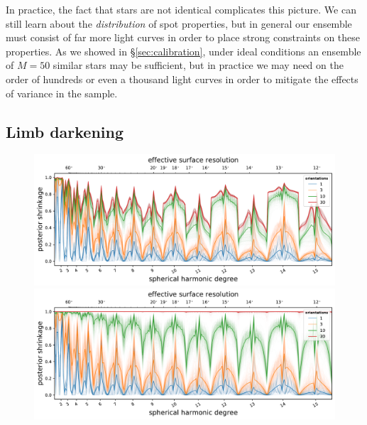 \documentclass[modern]{aastex62}
\begin{document}
In practice, the fact that stars are not identical complicates this picture.
We can still learn about the \emph{distribution} of spot properties, but
in general our ensemble must consist of far more light curves in order to
place strong constraints on these properties. As we showed in \S\ref{sec:calibration},
under ideal conditions an ensemble of $M = 50$ similar stars may be sufficient,
but in practice we may need on the order of hundreds or even a thousand light curves
in order to mitigate the effects of variance in the sample.

\subsection{Limb darkening}
\label{sec:limbdark}

\begin{figure}[t!]
    \begin{centering}
        \includegraphics[width=\linewidth]{figures/nullspace_ensemble_ld.pdf}
        \\
        \includegraphics[width=\linewidth]{figures/nullspace_ensemble_ld_var.pdf}
    \end{centering}
\end{figure}
\end{document}
